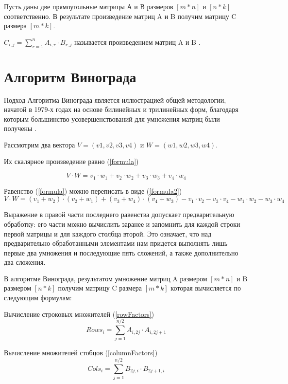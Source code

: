 \documentclass[12pt]{report}
\begin{document}
Пусть даны две прямоугольные матрицы А и В размеров $[m * n]$ и $[n * k]$ соответственно.  
В результате произведение матриц A и B получим матрицу C размера $[m *  k]$.

$C_{i,j} = \sum\limits_{r=1}^n A_{i,r}\cdot B_{r,j}$ называется произведением матриц A и B \cite{Beloysov}.


\section{Алгоритм Винограда}
Подход Алгоритма Винограда является иллюстрацией общей методологии, начатой в 1979-х годах на основе
билинейных и трилинейных форм, благодаря которым большинство усовершенствований для умножения матриц были получены \cite{Gall2012}.

Рассмотрим два вектора $V = (v1, v2, v3, v4)$ и $W = (w1, w2, w3, w4)$.  

 Их скалярное произведение равно (\ref{formula}) 

\begin{equation} \label{formula}
V \cdot W=v_1 \cdot w_1 + v_2 \cdot w_2 + v_3 \cdot w_3 + v_4 \cdot w_4
\end{equation}

Равенство (\ref{formula}) можно переписать в виде (\ref{formula2}) 
\begin{equation} \label{formula2}
V \cdot W=(v_1 + w_2) \cdot (v_2 + w_1) + (v_3 + w_4) \cdot (v_4 + w_3) - v_1 \cdot v_2 - v_3 \cdot v_4 - w_1 \cdot w_2 - w_3 \cdot w_4
\end{equation}

Выражение в правой части последнего равенства допускает предварительную обработку: его части можно вычислить заранее и запомнить для каждой строки первой матрицы и для каждого столбца второй. 
Это означает, что над предварительно обработанными элементами нам придется выполнять лишь первые два умножения и последующие пять сложений, а также дополнительно два сложения. 

В алгоритме Винограда, результатом умножение матриц A размером $[m * n]$ и B размером $[n * k]$ получим матрицу C размера $[m *  k]$ которая вычисляется по следующим формулам:

Вычисление строковых множителей (\ref{rowFactors})
\begin{equation} \label{rowFactors}
Rows_{i} = \sum\limits_{j = 1}^{n/2} A_{i, 2j} \cdot A_{i, 2j+1}
\end{equation}

Вычисление множителей стобцов (\ref{columnFactors})
\begin{equation} \label{columnFactors}
Cols_{i} = \sum\limits_{j = 1}^{n/2} B_{2j, i} \cdot B_{2j+1, i}
\end{equation}
\end{document}
